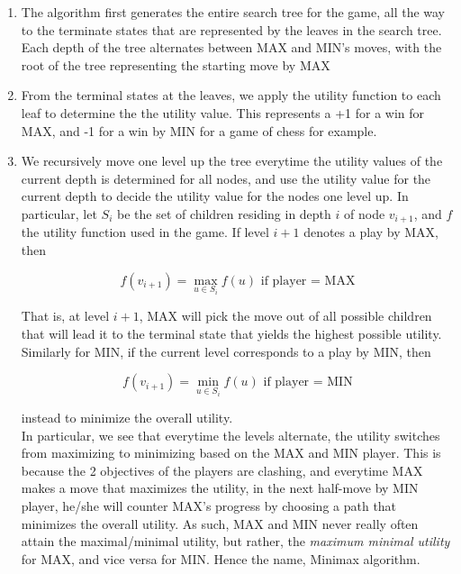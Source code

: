 \documentclass[12pt]{article}
\begin{document}
\begin{enumerate}
\item The algorithm first generates the entire search tree for the game, all the way to the terminate states that are represented by the leaves in the search tree. Each depth of the tree alternates between MAX and MIN's moves, with the root of the tree representing the starting move by MAX

\item From the terminal states at the leaves, we apply the utility function to each leaf to determine the the utility value. This represents a +1 for a win for MAX, and -1 for a win by MIN for a game of chess for example.

\item We recursively move one level up the tree everytime the utility values of the current depth is determined for all nodes, and use the utility value for the current depth to decide the utility value for the nodes one level up. In particular, let $S_i$ be the set of children residing in depth $i$ of node $v_{i+1}$, and $f$ the utility function used in the game. If level $i+1$ denotes a play by MAX, then 

\begin{equation*}
f(v_{i+1}) = \max_{u \in S_i} f(u) \text{ if player = MAX}
\end{equation*}

That is, at level $i+1$, MAX will pick the move out of all possible children that will lead it to the terminal state that yields the highest possible utility. Similarly for MIN, if the current level corresponds to a play by MIN, then 

\begin{equation*}
f(v_{i+1}) = \min_{u \in S_i} f(u) \text{ if player = MIN}
\end{equation*}

instead to minimize the overall utility.\\

In particular, we see that everytime the levels alternate, the utility switches from maximizing to minimizing based on the MAX and MIN player. This is because the 2 objectives of the players are clashing, and everytime MAX makes a move that maximizes the utility, in the next half-move by MIN player, he/she will counter MAX's progress by choosing a path that minimizes the overall utility. As such, MAX and MIN never really often attain the maximal/minimal utility, but rather, the \textit{maximum minimal utility} for MAX, and vice versa for MIN. Hence the name, Minimax algorithm.
\end{enumerate}
\end{document}
